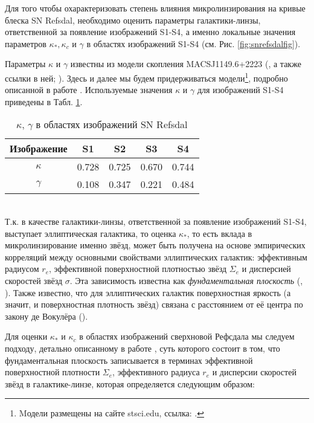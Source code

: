Для того чтобы охарактеризовать степень влияния микролинзирования на кривые блеска SN Refsdal, необходимо оценить параметры галактики-линзы, ответственной за появление изображений S1-S4, а именно локальные значения параметров $\kappa_*, \kappa_c$ и $\gamma$ в областях изображений S1-S4  (см. Рис. \ref{fig:snrefsdalfig}). 

Параметры $\kappa$ и $\gamma$ известны из модели скопления MACSJ1149.6+2223 (\cite{treu2016}, а также ссылки в ней; \cite{hubblemaps}). Здесь и далее мы будем придерживаться модели\footnote{Mодели размещены на сайте stsci.edu, ссылка: \cite{hlsp}.}, подробно описанной в работе \cite{kawamataoguri}. Используемые значения $\kappa$ и $\gamma$ для изображений S1-S4 приведены в Табл. \ref{tab:kappagamma}.

\begin{table}[h!]
  \caption{$\kappa$, $\gamma$ в областях изображений SN Refsdal}
  \label{tab:kappagamma}
  \centering
    \begin{tabular}{ | c | c | c | c | c |}
    \hline
    Изображение & S1 & S2 & S3 & S4 \\ \hline
    $\kappa$ & 0.728 & 0.725 & 0.670 & 0.744 \\ \hline
    $\gamma$ & 0.108 & 0.347 & 0.221 & 0.484 \\
    \hline
    \end{tabular}
\end{table}
\\
Т.к. в качестве галактики-линзы, ответственной за появление изображений S1-S4, выступает эллиптическая галактика, то оценка $\kappa_*$, то есть вклада в микролинзирование именно звёзд, может быть получена на основе эмпирических корреляций между основными свойствами эллиптических галактик: эффективным радиусом $r_e$, эффективной поверхностной плотностью звёзд $\Sigma_e$ и дисперсией скоростей звёзд $\sigma$. Эта зависимость известна как \textit{фундаментальная плоскость} (\cite{djorgovski&davis1987}, \cite{hydebernardi2009}). Также известно, что для эллиптических галактик поверхностная яркость (а значит, и поверхностная плотность звёзд) связана с расстоянием от её центра по закону де Вокулёра (\cite{vaucouleurs}).

Для оценки $\kappa_*$ и $\kappa_c$ в областях изображений сверхновой Рефсдала мы следуем подходу, детально описанному в работе \cite{schechter2014}, суть которого состоит в том, что фундаментальная плоскость записывается в терминах эффективной поверхностной плотности $\Sigma_{e}$, эффективного радиуса $r_e$ и дисперсии скоростей звёзд в галактике-линзе, которая определяется следующим образом:

